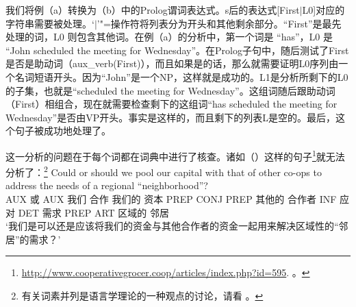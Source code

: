 \zl
%
我们将例（a）转换为（b）中的Prolog谓词表达式。s后的表达式[First$|$L0]对应的字符串需要被处理。`$|$'"=操作符将列表分为开头和其他剩余部分。“First”是最先处理的词，L0 则包含其他词。在例（a）的分析中，第一个词是 “has”，L0 是 “John scheduled the meeting for Wednesday”。在Prolog子句中，随后测试了First是否是助动词（aux\_verb(First)），而且如果是的话，那么就需要证明L0序列由一个名词短语开头。因为“John”是一个NP，这样就是成功的。L1是分析所剩下的L0的子集，也就是“scheduled the meeting for Wednesday”。这组词随后跟助动词（First）相组合，现在就需要检查剩下的这组词“has scheduled the meeting for Wednesday”是否由VP开头。事实是这样的，而且剩下的列表L是空的。最后，这个句子被成功地处理了。

这一分析的问题在于每个词都在词典中进行了核查。诸如（）这样的句子\footnote{
  \url{http://www.cooperativegrocer.coop/articles/index.php?id=595}. 。
}就无法分析了：\footnote{
  有关词素并列是语言学理论的一种观点的讨论，请看 。
} 
\ea
\gll Could or should we pool our capital with that of other co-ops to address the needs of a regional
``neighborhood''?\\
AUX 或 AUX 我们 合作 我们的 资本 PREP CONJ PREP 其他的 合作者 INF 应对 DET 需求 PREP ART 区域的 邻居\\
\glt `我们是可以还是应该将我们的资金与其他合作者的资金一起用来解决区域性的“邻居”的需求？'

